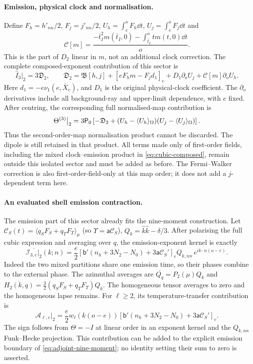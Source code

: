 \paragraph{Emission, physical clock and normalisation.}
Define $F_h=h'_{nn}/2$, $F_j=j'_{nn}/2$,
$U_h=\int_e^oF_h\dd t$, $U_j=\int_e^oF_j\dd t$ and
\[
 \mathcal C[m]=\frac{-\bar t_I^2m(\bar t_I,0)-\int_{\bar t_I}^otm(t,0)\dd t}{o}.
\]
This is the part of $D_2$ linear in $m$, not an additional clock correction.
The complete composed-exponent contribution of this sector is
\begin{equation}\label{eq:prop-complete-sector}
 \widehat I_3\big|_{2}=3\mathfrak D_2,\qquad
 \mathfrak D_2=\mathfrak B[h,j]
 +[eF_hm-F_jd_1]_e+D_1\partial_oU_j+\mathcal C[m]\partial_oU_h.
\end{equation}
Here $d_1=-e\nu_1(e,\bar X_e)$, and $D_1$ is the original physical-clock coefficient.
The $\partial_o$ derivatives include all background-ray and upper-limit dependence, with
$e$ fixed. After centring, the corresponding full normalised-map contribution is
\begin{equation}\label{eq:prop-normalized-sector}
 \Theta^{(3)}\big|_2=3\mathsf P_0\left[
 -\mathfrak D_2+(U_h-\langle U_h\rangle_{\Omega})(U_j-\langle U_j\rangle_{\Omega})\right].
\end{equation}
Thus the second-order-map normalisation product cannot be discarded. The dipole is still
retained in that product. All terms made only of first-order fields, including the mixed
clock--emission product in \eqref{eq:cubic-composed}, remain outside this isolated sector and
must be added as before. The Fermi--Walker correction is also first-order-field-only at this
map order; it does not add a $j$-dependent term here.

\paragraph{An evaluated shell emission contraction.}
The emission part of this sector already fits the nine-moment construction. Let
$\mathcal C_S(t)=\langle q_SF_S+q_TF_T\rangle_\mu$ (so $\Upsilon=\mathsf a\mathcal C_S$),
$Q_k=\hat k\hat k-\delta/3$. After polarising the full cubic expression and averaging over
$\hat q$, the emission-exponent kernel is exactly
\begin{equation}\label{eq:prop-emission-moments}
 \overline{\mathcal I_{3,e}\big|_2}(k;n)
 =\frac e2\left[
 \mathsf b'(n_h+3N_2-N_0)+3\mathsf a\mathcal C_S'
 \right]_e Q_{k,nn}\,e^{ik\cdot n(o-e)}.
\end{equation}
Indeed the two mixed partitions share one emission time, so their phases combine to the
external phase. The azimuthal averages are
$\overline{Q_q}=P_2(\mu)Q_k$ and
$\overline{H_2(k,q)}=\tfrac32(q_SF_S+q_TF_T)Q_k$.
The homogeneous tensor averages to zero and the homogeneous lapse remains.
For $\ell\ge2$, its temperature-transfer contribution is
\[
 \mathcal A_{\ell,e}\big|_2
 =\frac e2 w_\ell(k(o-e))
 [\mathsf b'(n_h+3N_2-N_0)+3\mathsf a\mathcal C_S']_e.
\]
The sign follows from $\Theta=-I$ at linear order in an exponent kernel and the
$Q_{k,nn}$ Funk--Hecke projection. This contribution can be added to the explicit emission
boundary of \eqref{eq:adjoint-nine-moment}; no identity setting their sum to zero is asserted.

